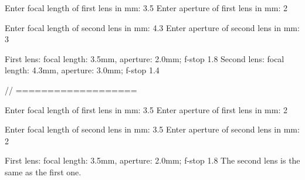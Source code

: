 \begin{exercise}
\begin{stdout}
Enter focal length of first lens in mm: 3.5
Enter aperture of first lens in mm: 2

Enter focal length of second lens in mm: 4.3
Enter aperture of second lens in mm: 3

First lens: focal length: 3.5mm, aperture: 2.0mm; f-stop 1.8
Second lens: focal length: 4.3mm, aperture: 3.0mm; f-stop 1.4

// ===================

Enter focal length of first lens in mm: 3.5
Enter aperture of first lens in mm: 2

Enter focal length of second lens in mm: 3.5
Enter aperture of second lens in mm: 2

First lens: focal length: 3.5mm, aperture: 2.0mm; f-stop 1.8
The second lens is the same as the first one.
\end{stdout}

\end{exercise}

